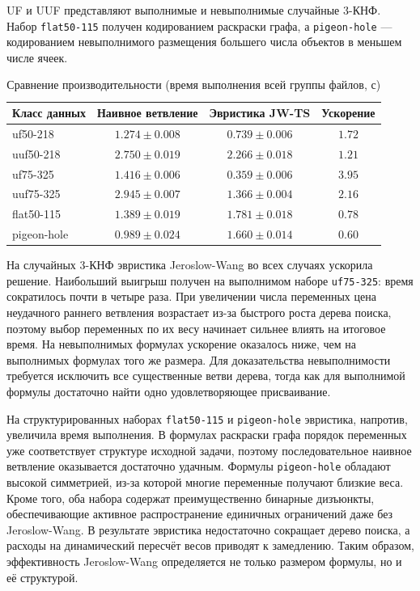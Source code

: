 \documentclass[a4paper]{article}
\begin{document}
UF и UUF представляют выполнимые и невыполнимые случайные 3-КНФ. Набор
\texttt{flat50-115} получен кодированием раскраски графа, а
\texttt{pigeon-hole} --- кодированием невыполнимого размещения большего числа
объектов в меньшем числе ячеек.

\begin{table}[H]
    \centering
    \caption{Сравнение производительности (время выполнения всей группы файлов, с)}
    \label{tab:results}
    \vspace{0.5em}
    \begin{tabular}{lccc}
        \toprule
        \textbf{Класс данных} & \textbf{Наивное ветвление} & \textbf{Эвристика JW-TS} & \textbf{Ускорение}\\
        \midrule
        uf50-218       & $1.274 \pm 0.008$ & $0.739 \pm 0.006$ & $1.72$\\
        uuf50-218      & $2.750 \pm 0.019$ & $2.266 \pm 0.018$ & $1.21$\\
        uf75-325       & $1.416 \pm 0.006$ & $0.359 \pm 0.006$ & $3.95$\\
        uuf75-325      & $2.945 \pm 0.007$ & $1.366 \pm 0.004$ & $2.16$\\
        flat50-115     & $1.389 \pm 0.019$ & $1.781 \pm 0.018$ & $0.78$\\
        pigeon-hole    & $0.989 \pm 0.024$ & $1.660 \pm 0.014$ & $0.60$\\
        \bottomrule
    \end{tabular}
\end{table}

На случайных 3-КНФ эвристика Jeroslow-Wang во всех случаях ускорила решение.
Наибольший выигрыш получен на выполнимом наборе \texttt{uf75-325}: время
сократилось почти в четыре раза. При увеличении числа переменных цена неудачного
раннего ветвления возрастает из-за быстрого роста дерева поиска, поэтому выбор
переменных по их весу начинает сильнее влиять на итоговое время. На
невыполнимых формулах ускорение оказалось ниже, чем на выполнимых формулах того
же размера. Для доказательства невыполнимости требуется исключить все
существенные ветви дерева, тогда как для выполнимой формулы достаточно найти
одно удовлетворяющее присваивание.

На структурированных наборах \texttt{flat50-115} и \texttt{pigeon-hole}
эвристика, напротив, увеличила время выполнения. В формулах раскраски графа
порядок переменных уже соответствует структуре исходной задачи, поэтому
последовательное наивное ветвление оказывается достаточно удачным. Формулы
\texttt{pigeon-hole} обладают высокой симметрией, из-за которой многие
переменные получают близкие веса. Кроме того, оба набора содержат преимущественно
бинарные дизъюнкты, обеспечивающие активное распространение единичных
ограничений даже без Jeroslow-Wang. В результате эвристика недостаточно
сокращает дерево поиска, а расходы на динамический пересчёт весов приводят к
замедлению. Таким образом, эффективность Jeroslow-Wang определяется не только
размером формулы, но и её структурой.
\end{document}
